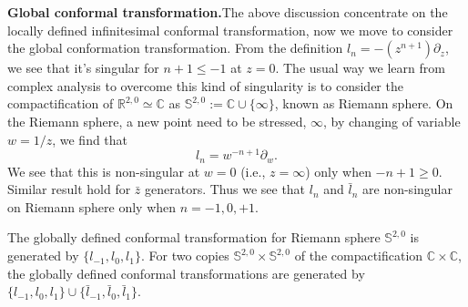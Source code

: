 \documentclass[graybox,envcountchap,sectrefs]{svmono}
\begin{document}
\textbf{Global conformal transformation.}\textemdash The above discussion concentrate on the locally defined infinitesimal conformal transformation, now we move to consider the global conformation transformation. 
From the definition $l_n=-(z^{n+1})\partial_{z}$, we see that it's singular for $n+1\leq -1$ at $z=0$.
The usual way we learn from complex analysis to overcome this kind of singularity is to consider the compactification of $\mathbb{R}^{2,0}\simeq \mathbb{C}$ as $\mathbb{S}^{2,0}:=\mathbb{C}\cup \{\infty\}$, known as Riemann sphere. On the Riemann sphere, a new point need to be stressed, $\infty$, by changing of variable $w=1/z$, we find that 
\begin{equation}
	l_n=w^{-n+1}\partial_w.
\end{equation}
We see that this is non-singular at $w=0$ (i.e., $z=\infty$) only when $-n+1\geq 0$.
Similar result hold for $\bar{z}$ generators.
Thus we see that $l_n$ and $\bar{l}_n$ are non-singular on Riemann sphere only when $n=-1,0,+1$.
\begin{svgraybox}
\begin{theorem}
	The globally defined conformal transformation for Riemann sphere $\mathbb{S}^{2,0}$ is generated by $\{l_{-1},l_0,l_1\}$. For two copies $\mathbb{S}^{2,0}\times \mathbb{S}^{2,0}$ of the compactification $\mathbb{C}\times \mathbb{C}$, the globally defined conformal transformations are generated by $\{l_{-1},l_0,l_1\}\cup \{\bar{l}_{-1},\bar{l}_0,\bar{l}_1\}$.
\end{theorem}	
\end{svgraybox}
\end{document}

